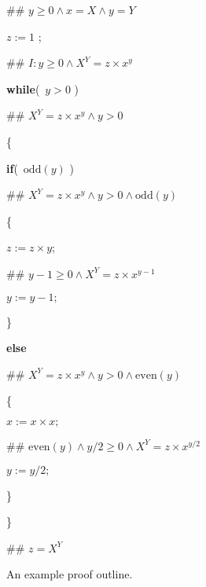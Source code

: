 \documentclass[11pt]{article}%
\begin{document}
\begin{figure}[tb]%


\begin{code}
\#\# $y\geq0\wedge x=X\wedge y=Y$

$z:=1$ ;

\#\# $I:y\geq0\wedge X^{Y}=z\times x^{y}$

\textbf{while}(\ $y>0$ )

\#\# $X^{Y}=z\times x^{y}\wedge y>0$

\{

\begin{indent}
\item \textbf{if}(\ $\mathrm{odd}(y)$ )

\item \#\# $X^{Y}=z\times x^{y}\wedge y>0\wedge\mathrm{odd}(y)$

\item \{

\begin{indent}
\item $z:=z\times y$;

\item \#\# $y-1\geq0\wedge X^{Y}=z\times x^{y-1}$

\item $y:=y-1;$
\end{indent}

\item \}

\item \textbf{else}

\item \#\# $X^{Y}=z\times x^{y}\wedge y>0\wedge\mathrm{even}(y)$

\item \{

\begin{indent}
\item $x:=x\times x;$

\item \#\# $\mathrm{even}(y)\wedge y/2\geq0\wedge X^{Y}=z\times x^{y/2}$

\item $y:=y/2;$
\end{indent}

\item \}
\end{indent}

\}

\#\# $z=X^{Y}$
\end{code}

%

\caption{An example proof outline.}\label{po}\end{figure}%
\end{document}
